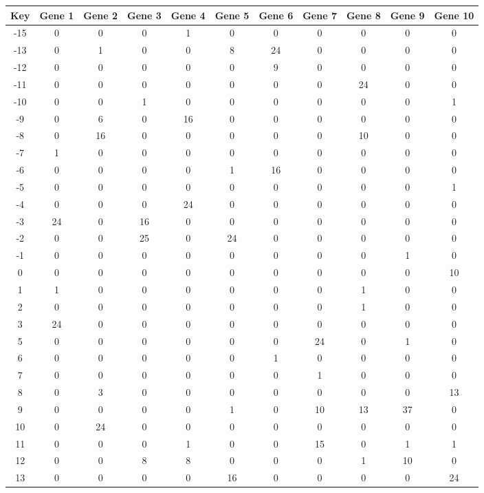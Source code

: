 \begin{tabular}{|c|c|c|c|c|c|c|c|c|c|c|}
\hline
Key & Gene 1 & Gene 2 & Gene 3 & Gene 4 & Gene 5 & Gene 6 & Gene 7 & Gene 8 & Gene 9 & Gene 10 \\
\hline
-15 & 0 & 0 & 0 & 1 & 0 & 0 & 0 & 0 & 0 & 0 \\
-13 & 0 & 1 & 0 & 0 & 8 & 24 & 0 & 0 & 0 & 0 \\
-12 & 0 & 0 & 0 & 0 & 0 & 9 & 0 & 0 & 0 & 0 \\
-11 & 0 & 0 & 0 & 0 & 0 & 0 & 0 & 24 & 0 & 0 \\
-10 & 0 & 0 & 1 & 0 & 0 & 0 & 0 & 0 & 0 & 1 \\
-9 & 0 & 6 & 0 & 16 & 0 & 0 & 0 & 0 & 0 & 0 \\
-8 & 0 & 16 & 0 & 0 & 0 & 0 & 0 & 10 & 0 & 0 \\
-7 & 1 & 0 & 0 & 0 & 0 & 0 & 0 & 0 & 0 & 0 \\
-6 & 0 & 0 & 0 & 0 & 1 & 16 & 0 & 0 & 0 & 0 \\
-5 & 0 & 0 & 0 & 0 & 0 & 0 & 0 & 0 & 0 & 1 \\
-4 & 0 & 0 & 0 & 24 & 0 & 0 & 0 & 0 & 0 & 0 \\
-3 & 24 & 0 & 16 & 0 & 0 & 0 & 0 & 0 & 0 & 0 \\
-2 & 0 & 0 & 25 & 0 & 24 & 0 & 0 & 0 & 0 & 0 \\
-1 & 0 & 0 & 0 & 0 & 0 & 0 & 0 & 0 & 1 & 0 \\
0 & 0 & 0 & 0 & 0 & 0 & 0 & 0 & 0 & 0 & 10 \\
1 & 1 & 0 & 0 & 0 & 0 & 0 & 0 & 1 & 0 & 0 \\
2 & 0 & 0 & 0 & 0 & 0 & 0 & 0 & 1 & 0 & 0 \\
3 & 24 & 0 & 0 & 0 & 0 & 0 & 0 & 0 & 0 & 0 \\
5 & 0 & 0 & 0 & 0 & 0 & 0 & 24 & 0 & 1 & 0 \\
6 & 0 & 0 & 0 & 0 & 0 & 1 & 0 & 0 & 0 & 0 \\
7 & 0 & 0 & 0 & 0 & 0 & 0 & 1 & 0 & 0 & 0 \\
8 & 0 & 3 & 0 & 0 & 0 & 0 & 0 & 0 & 0 & 13 \\
9 & 0 & 0 & 0 & 0 & 1 & 0 & 10 & 13 & 37 & 0 \\
10 & 0 & 24 & 0 & 0 & 0 & 0 & 0 & 0 & 0 & 0 \\
11 & 0 & 0 & 0 & 1 & 0 & 0 & 15 & 0 & 1 & 1 \\
12 & 0 & 0 & 8 & 8 & 0 & 0 & 0 & 1 & 10 & 0 \\
13 & 0 & 0 & 0 & 0 & 16 & 0 & 0 & 0 & 0 & 24 \\
\hline
\end{tabular}